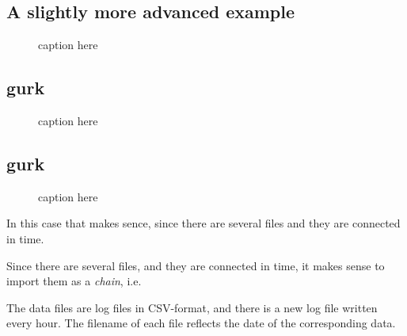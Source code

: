 \documentclass[a4paper]{article}
\begin{document}
\subsection{A slightly more advanced example}
\begin{figure}[h!]
  \begin{center}
    
    \caption{caption here}
    \label{figure:example}
  \end{center}
\end{figure}




\subsection{gurk}
\begin{figure}[h!]
  \begin{center}
    
    \caption{caption here}
    \label{figure:example}
  \end{center}
\end{figure}

\subsection{gurk}
\begin{figure}[h!]
  \begin{center}
    
    \caption{caption here}
    \label{figure:example}
  \end{center}
\end{figure}



















In this case that makes sence, since there are several files and they
are connected in time.

Since there are several files, and they are
connected in time, it makes sense to import them as a \textsl{chain},
i.e.\ 


The data files are log files in CSV-format, and there is a new log
file written every hour.  The filename of each file reflects the date
of the corresponding data.
\end{document}
